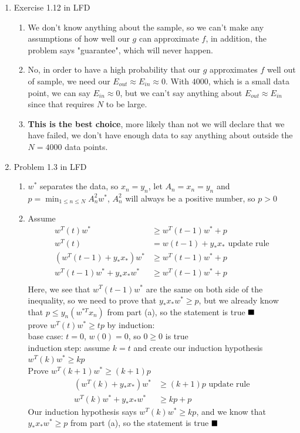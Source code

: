 \documentclass{article}
\begin{document}
\begin{enumerate}
        \item Exercise 1.12 in LFD
        \begin{enumerate}[label=(\alph*)]
            \item We don't know anything about the sample, so we can't make any assumptions of how well our $g$ can approximate $f$, in addition, the problem says "guarantee", which will never happen.
            \item No, in order to have a high probability that our $g$ approximates $f$ well out of sample, we need our $E_{out} \approx E_{in} \approx 0$. With $4000$, which is a small data point, we can say $E_{in} \approx 0$, but we can't say anything about $E_{out} \approx E_{in}$ since that requires $N$ to be large.
            \item \textbf{This is the best choice}, more likely than not we will declare that we have failed, we don't have enough data to say anything about outside the $N = 4000$ data points.
        \end{enumerate}

        \item Problem 1.3 in LFD
        \begin{enumerate}[label=(\alph*)]
            \item $w^*$ separates the data, so $x_n = y_n$, let $A_n = x_n = y_n$ and $p = \min_{1 \leq n \leq N} A^2_nw^*$, $A^2_n$ will always be a positive number, so $p>0$
            \item Assume
            \begin{align*}
                w^T(t)w^* &\geq w^T(t-1)w^* + p\\
                w^T(t) &= w(t-1) + y_*x_* \text{ update rule}\\
                (w^T(t-1) + y_*x_*)w^* &\geq w^T(t-1)w^* + p\\
                w^T(t-1)w^* + y_*x_*w^* &\geq w^T(t-1)w^* + p\\
            \end{align*}
                Here, we see that $w^T(t-1)w^*$ are the same on both side of the inequality, so we need to prove that $y_*x_*w^* \geq p$, but we already know that $p \leq y_n(w^{*T}x_n)$ from part (a), so the statement is true $\hfill \blacksquare$
                \\[0.25in] prove $w^T(t)w^* \geq tp$ by induction:\\
                base case: $t=0$, $w(0) = 0$, so $0\geq0$ is true\\
                induction step: assume $k=t$ and create our induction hypothesis $w^T(k)w^* \geq kp$\\
                Prove $w^T(k+1)w^* \geq (k+1)p$
                \begin{align*}
                    (w^T(k) + y_*x_*)w^* &\geq (k+1)p \text{ update rule}\\
                    w^T(k)w^* + y_*x_*w^* &\geq kp + p
                \end{align*}
                Our induction hypothesis says $w^T(k)w^* \geq kp$, and we know that $y_*x_*w^* \geq p$ from part (a), so the statement is true $\hfill \blacksquare$
            

\end{enumerate}
\end{enumerate}
\end{document}
